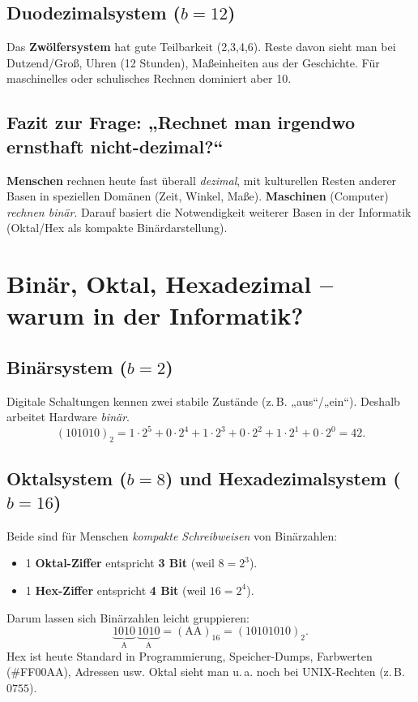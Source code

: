 \documentclass[12pt,a4paper]{book}
\begin{document}
\subsection*{Duodezimalsystem (\(b=12\))}
Das \textbf{Zwölfersystem} hat gute Teilbarkeit (2,3,4,6). Reste davon sieht man bei Dutzend/Groß, Uhren (12 Stunden), Maßeinheiten aus der Geschichte. Für maschinelles oder schulisches Rechnen dominiert aber 10.

\subsection*{Fazit zur Frage: „Rechnet man irgendwo ernsthaft nicht-dezimal?“}
\textbf{Menschen} rechnen heute fast überall \emph{dezimal}, mit kulturellen Resten anderer Basen in speziellen Domänen (Zeit, Winkel, Maße).  
\textbf{Maschinen} (Computer) \emph{rechnen binär}. Darauf basiert die Notwendigkeit weiterer Basen in der Informatik (Oktal/Hex als kompakte Binärdarstellung).

\section{Binär, Oktal, Hexadezimal – warum in der Informatik?}
\subsection*{Binärsystem (\(b=2\))}
Digitale Schaltungen kennen zwei stabile Zustände (z.\,B. „aus“/„ein“). Deshalb arbeitet Hardware \emph{binär}.
\[
(101010)_2 = 1\cdot 2^5 + 0\cdot 2^4 + 1\cdot 2^3 + 0\cdot 2^2 + 1\cdot 2^1 + 0\cdot 2^0 = 42.
\]

\subsection*{Oktalsystem (\(b=8\)) und Hexadezimalsystem (\(b=16\))}
Beide sind für Menschen \emph{kompakte Schreibweisen} von Binärzahlen:
\begin{itemize}
	\item 1 \textbf{Oktal-Ziffer} entspricht \textbf{3 Bit} (weil \(8=2^3\)).
	\item 1 \textbf{Hex-Ziffer} entspricht \textbf{4 Bit} (weil \(16=2^4\)).
\end{itemize}
Darum lassen sich Binärzahlen leicht gruppieren:
\[
\underbrace{1010}_{\text{A}}\,\underbrace{1010}_{\text{A}} = (\text{AA})_{16} = (10101010)_2.
\]
Hex ist heute Standard in Programmierung, Speicher-Dumps, Farbwerten (\#FF00AA), Adressen usw.
Oktal sieht man u.\,a. noch bei UNIX-Rechten (z.\,B. \(0755\)).
\end{document}

